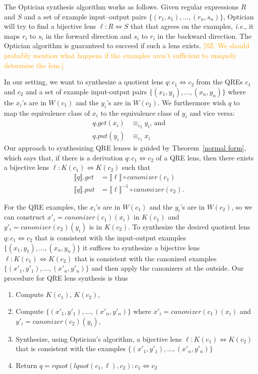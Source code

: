\documentclass[acmsmall,review,anonymous]{acmart}
\newcommand{\FINISH}[3]{\ifdraft\textcolor{#1}{[#2: #3]}\fi}
\newcommand{\saz}[1]{\FINISH{orange}{SZ}{#1}}
\newcommand{\kw}[1]{\ensuremath{\mathit{#1}}}
\newcommand{\canonizer}{\ensuremath{\kw{canonizer}}}
\newcommand{\get}{\ensuremath{\kw{get}}}
\newcommand{\lput}{\ensuremath{\kw{put}}}
\begin{document}
The Optician synthesis algorithm works as follows. Given regular expressions $R$
and $S$ and a set of example input--output pairs
$\{(r_1, s_1),\allowbreak \ldots,\allowbreak (r_n, s_n)\}$, Optician will try to
find a bijective lens $\ell : R \Leftrightarrow S$ that that agrees on the
examples, \textit{i.e.}, it maps $r_i$ to $s_i$ in the forward direction and
$s_i$ to $r_i$ in the backward direction.  The Optician algorithm is guaranteed
to succeed if such a lens exists.    \saz{We should probably mention what
happens if the examples aren't sufficient to uniquely determine the lens.}

In our setting, we want to synthesize a quotient lens $q: c_1 \Leftrightarrow
c_2$ from the QREs $c_1$ and $c_2$ and a set of example input-output pairs
$\{(x_1, y_1),\allowbreak \ldots,\allowbreak (x_n, y_n)\}$ where the $x_i$'s are
in $W(c_1)$ and the $y_i$'s are in $W(c_2)$. We furthermore wish $q$ to map the
equivalence class of $x_i$ to the equivalence class of $y_i$ and vice versa:
\begin{align*}
q.\get(x_i) &\equiv_{c_2} y_i \text{, and}\\
q.\lput(y_i) &\equiv_{c_1} x_i
\end{align*}
Our approach to synthesizing QRE lenses is guided by Theorem~\ref{normal form},
which says that, if there is a derivation $q : c_1 \Leftrightarrow c_2$ of a
QRE lens, then there exists a bijective lens $\ell : K(c_1) \Leftrightarrow
K(c_2)$ such that
\begin{align*}
\llbracket q \rrbracket.\get &= \llbracket \ell \rrbracket\circ \canonizer(c_1)\\
\llbracket q \rrbracket.\lput &= \llbracket \ell \rrbracket^{-1} \circ
\canonizer(c_2).
\end{align*}

For the QRE examples, the $x_i$'s are in $W(c_1)$ and the $y_i$'s are
in $W(c_2)$, so we can construct ${x'_i} = \canonizer(c_1)(x_i)$ in $K(c_1)$
and ${y'_i} = \canonizer(c_2)(y_i)$ is in $K(c_2)$. To synthesize the
desired quotient lens $q: c_1 \Leftrightarrow c_2$ that is consistent with the
input-output examples $\{(x_1, y_1), \ldots, (x_n, y_n)\}$ it suffices to
synthesize a bijective lens $\ell : K(c_1) \Leftrightarrow K(c_2)$ that is
consistent with the canonized examples $\{({x'_1}, {y'_1}), \ldots, ({x'_n},
{y'_n})\}$ and then apply the canonizers at the outside. Our procedure for QRE
lens synthesis is thus
\begin{enumerate}
  \item
  Compute $K(c_1)$, $K(c_2)$,
  \item
  Compute $\{({x'_1}, {y'_1}), \ldots, ({x'_n}, {y'_n})\}$ where ${x'_i} =
  \canonizer(c_1)(x_i)$ and ${y'_i} = \canonizer(c_2)(y_i)$,
\item Synthesize, using Optician's algorithm, a bijective lens
  $\ell : K(c_1) \Leftrightarrow K(c_2)$ that is consistent with the examples
  $\{({x'_1}, {y'_1}),\allowbreak \ldots,\allowbreak ({x'_n}, {y'_n})\}$
  \item
  Return $q = \kw{rquot}(\kw{lquot}(c_1, \ell), c_2) : c_1 \Leftrightarrow
  c_2$
\end{enumerate}
\end{document}
